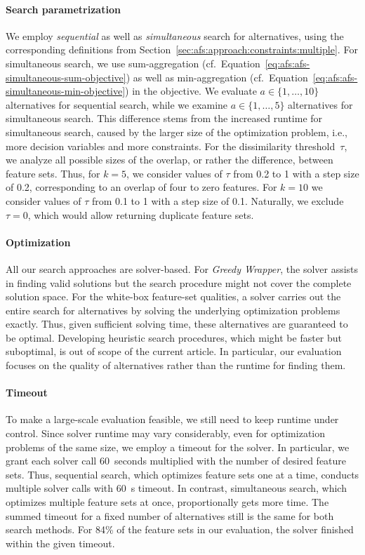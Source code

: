 \documentclass{article}
\theoremstyle{definition}
\begin{document}
\paragraph{Search parametrization}

We employ \emph{sequential} as well as \emph{simultaneous} search for alternatives, using the corresponding definitions from Section~\ref{sec:afs:approach:constraints:multiple}.
For simultaneous search, we use sum-aggregation (cf.~Equation~\ref{eq:afs:afs-simultaneous-sum-objective}) as well as min-aggregation (cf.~Equation~\ref{eq:afs:afs-simultaneous-min-objective}) in the objective.
We evaluate $a \in \{1, \dots, 10\}$ alternatives for sequential search, while we examine $a \in \{1, \dots, 5\}$ alternatives for simultaneous search.
This difference stems from the increased runtime for simultaneous search, caused by the larger size of the optimization problem, i.e., more decision variables and more constraints.
For the dissimilarity threshold~$\tau$, we analyze all possible sizes of the overlap, or rather the difference, between feature sets.
Thus, for $k=5$, we consider values of $\tau$ from 0.2 to 1 with a step size of 0.2, corresponding to an overlap of four to zero features.
For $k=10$ we consider values of $\tau$ from 0.1 to 1 with a step size of 0.1.
Naturally, we exclude $\tau = 0$, which would allow returning duplicate feature sets.

\paragraph{Optimization}

All our search approaches are solver-based.
For \emph{Greedy Wrapper}, the solver assists in finding valid solutions but the search procedure might not cover the complete solution space.
For the white-box feature-set qualities, a solver carries out the entire search for alternatives by solving the underlying optimization problems exactly.
Thus, given sufficient solving time, these alternatives are guaranteed to be optimal.
Developing heuristic search procedures, which might be faster but suboptimal, is out of scope of the current article.
In particular, our evaluation focuses on the quality of alternatives rather than the runtime for finding them.

\paragraph{Timeout}

To make a large-scale evaluation feasible, we still need to keep runtime under control.
Since solver runtime may vary considerably, even for optimization problems of the same size, we employ a timeout for the solver.
In particular, we grant each solver call 60~seconds multiplied with the number of desired feature sets.
Thus, sequential search, which optimizes feature sets one at a time, conducts multiple solver calls with 60~s timeout.
In contrast, simultaneous search, which optimizes multiple feature sets at once, proportionally gets more time.
The summed timeout for a fixed number of alternatives still is the same for both search methods.
For 84\% of the feature sets in our evaluation, the solver finished within the given timeout.
\end{document}
